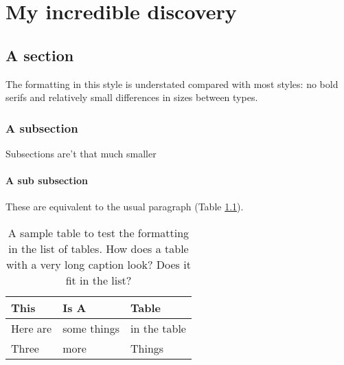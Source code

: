 \chapter{My incredible discovery}
\label{chap:incredible-discovery}

\section{A section}

The formatting in this style is understated compared with most styles:
no bold serifs and relatively small differences in sizes between types.

\subsection{A subsection}

Subsections are't that much smaller

\subsubsection{A sub subsection}

These are equivalent to the usual paragraph (Table \ref{table:sample}).

\begin{center}
\begin{table}[h]
\caption[Sample table]{A sample table to test the formatting in the list of tables.  How does
		 a table with a very long caption look?  Does it fit in the list?}
\label{table:sample}
\vspace{10pt}
\begin{tabular}[c]{l l l}
\hline
This 		& Is A 			& Table \\ \hline
Here are 	& some things	& in the table \\
Three		& more			& Things \\
\end{tabular}
\end{table}
\end{center}



